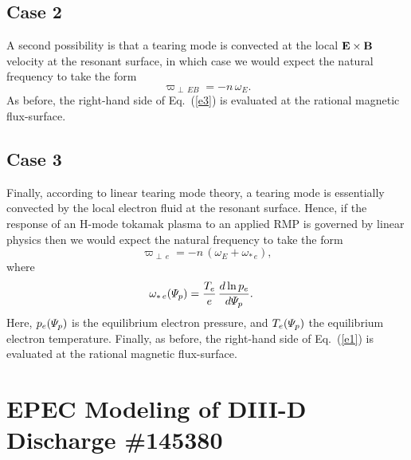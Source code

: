 \documentclass[12pt,prb,aps]{revtex4-1}
\begin{document}
\subsection{Case 2}
A second possibility is that a tearing mode is convected at the local ${\bf E}\times{\bf B}$ velocity at the resonant surface,\cite{heyn,lyons,paz1}
in which case we would expect the natural frequency to take the form 
\begin{equation}\label{e3}
\varpi_{\perp\, EB} =-n\,\omega_E.
\end{equation}
As before, the right-hand side of Eq.~(\ref{e3}) is evaluated
at the rational magnetic flux-surface. 

\subsection{Case 3}
Finally, according to
linear tearing mode theory, a tearing mode is essentially convected by
the local electron fluid at the resonant surface.\cite{hender,cole} Hence, if the response of an H-mode tokamak plasma to an applied RMP
is governed by linear physics then we would expect the
natural frequency to take the form\,\cite{lin1,lin2,lin3}
\begin{equation}
\varpi_{\perp\,e} = - n\,(\omega_E+\omega_{\ast\,e}),\label{e1}
\end{equation}
where
\begin{align}
\omega_{\ast\,e}({\mit\Psi}_p) &=\frac{T_e}{e}\,\frac{d\ln p_e}{d{\mit\Psi}_p}.
\end{align}
 Here, $p_e({\mit\Psi}_p)$ is the equilibrium
electron pressure, and $T_e({\mit\Psi}_p)$ the equilibrium
electron temperature.
Finally,
as before, the right-hand side of Eq.~(\ref{e1}) is evaluated
at the rational magnetic flux-surface. 

\section{EPEC Modeling of DIII-D Discharge \#145380}
\end{document}
